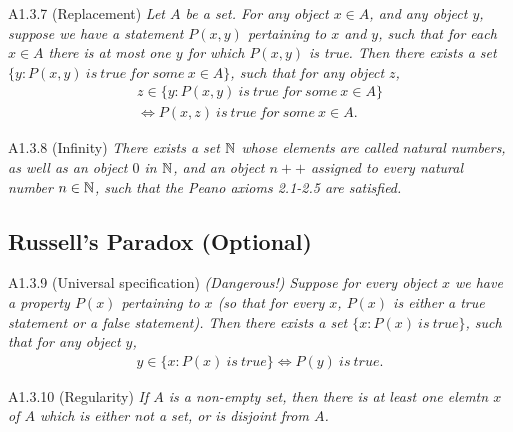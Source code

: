 \begin{axiom}{A1.3.7}
    (Replacement) \emph{Let $A$ be a set. For any object $x\in A$, and any object $y$, suppose we have a statement
    $P(x,y)$ pertaining to $x$ and $y$, such that for each $x\in A$ there is at most one $y$ for which $P(x,y)$ is true.
    Then there exists a set $\{y:P(x,y)~is~true~for~some~x\in A\}$, such that for any object $z$,
    \begin{align*}
        z\in \{y:P(x,y)~is~true~for~some~x\in A\}
        \\ \iff P(x,z)~is~true~for~some~x \in A.
    \end{align*}}
\end{axiom}

\begin{axiom}{A1.3.8}
    (Infinity) \emph{There exists a set $\mathbb{N}$ whose elements are called natural numbers, as well as an object $0$ in $\mathbb{N}$,
    and an object $n++$ assigned to every natural number $n\in \mathbb{N}$, such that the Peano axioms 2.1-2.5 are satisfied.}
\end{axiom}

\subsection{Russell's Paradox (Optional)}
\begin{axiom}{A1.3.9}
    (Universal specification) \emph{(Dangerous!) Suppose for every object $x$ we have a property $P(x)$ pertaining
    to $x$ (so that for every $x$, $P(x)$ is either a true statement or a false statement). Then there exists a set
    $\{x:P(x)~is~true\}$, such that for any object $y$,
    \begin{align*}
        y\in \{x:P(x)~is~true\} \iff P(y)~is~true.
    \end{align*}}
\end{axiom}

\begin{axiom}{A1.3.10}
    (Regularity) \emph{If $A$ is a non-empty set, then there is at least one elemtn $x$ of $A$ which is either not a set,
    or is disjoint from $A$.}
\end{axiom}

